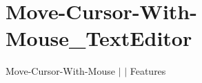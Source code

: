 \chapter{Move-\/\+Cursor-\/\+With-\/\+Mouse\+\_\+\+Text\+Editor }
\hypertarget{md__docs_2_text_editor_2_features_2_move-_cursor-_with-_mouse___text_editor}{}\label{md__docs_2_text_editor_2_features_2_move-_cursor-_with-_mouse___text_editor}
Move-\/\+Cursor-\/\+With-\/\+Mouse \texorpdfstring{$\vert$}{|}  \texorpdfstring{$\vert$}{|} Features



 